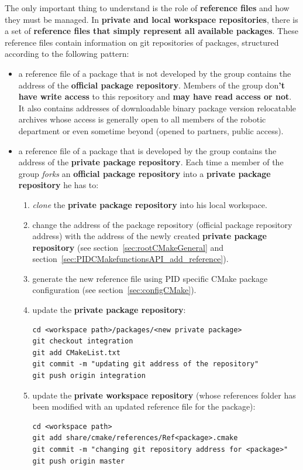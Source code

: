 \documentclass[12pt,a4paper]{article}
\begin{document}
The only important thing to understand is the role of \textbf{reference files} and how they must be managed. In \textbf{private and local workspace repositories}, there is a set of \textbf{reference files that simply represent all available packages}. These reference files contain information on git repositories of packages, structured according to the following pattern:
\begin{itemize}
\item a reference file of a package that is not developed by the group contains the address of the \textbf{official package repository}. Members of the group don\textbf{'t have write access} to this repository and \textbf{may have read access or not}. It also contains addresses of downloadable binary package version relocatable archives whose access is generally open to all members of the robotic department or even sometime beyond (opened to partners, public access).
\item a reference file of a package that is developed by the group contains the address of the \textbf{private package repository}. Each time a member of the group \textit{forks} an \textbf{official package repository} into a \textbf{private package repository} he has to:
\begin{enumerate}
\item \textit{clone} the \textbf{private package repository} into his local workspace.
\item change the address of the package repository (official package repository address) with the address of the newly created \textbf{private package repository} (see section~\ref{sec:rootCMakeGeneral} and section~\ref{sec:PIDCMakefunctionsAPI_add_reference}).
\item generate the new reference file using PID specific CMake package configuration (see section~\ref{sec:configCMake}).
\item update the \textbf{private package repository}:
\begin{verbatim}
cd <workspace path>/packages/<new private package>
git checkout integration
git add CMakeList.txt
git commit -m "updating git address of the repository"
git push origin integration
\end{verbatim}
\item update the \textbf{private workspace repository} (whose references folder has been modified with an updated reference file for the package):
\begin{verbatim}
cd <workspace path>
git add share/cmake/references/Ref<package>.cmake
git commit -m "changing git repository address for <package>"
git push origin master
\end{verbatim}
\end{enumerate}
\end{itemize}
\end{document}
